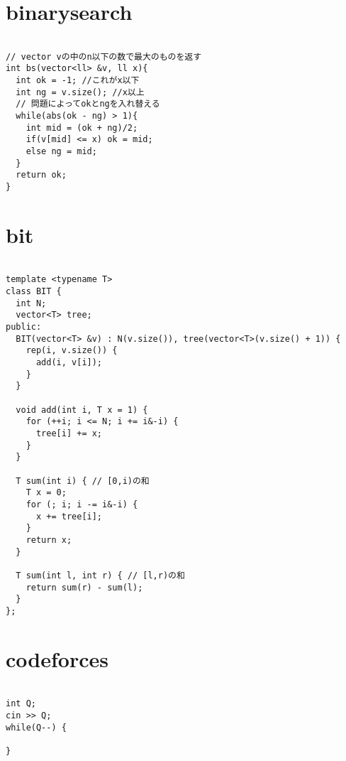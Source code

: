 \documentclass[a4j,titlepage]{jarticle} %
\begin{document}
\color{white}
\section{binarysearch}
\color{black}
\begin{lstlisting}[caption=binarysearch]

// vector vの中のn以下の数で最大のものを返す
int bs(vector<ll> &v, ll x){
  int ok = -1; //これがx以下 
  int ng = v.size(); //x以上 
  // 問題によってokとngを入れ替える
  while(abs(ok - ng) > 1){
    int mid = (ok + ng)/2;
    if(v[mid] <= x) ok = mid;
    else ng = mid;
  }
  return ok;
}

\end{lstlisting}

\color{white}
\section{bit}
\color{black}
\begin{lstlisting}[caption=bit]

template <typename T>
class BIT {
  int N;
  vector<T> tree;
public:
  BIT(vector<T> &v) : N(v.size()), tree(vector<T>(v.size() + 1)) {
    rep(i, v.size()) {
      add(i, v[i]);
    }
  }

  void add(int i, T x = 1) {
    for (++i; i <= N; i += i&-i) {
      tree[i] += x;
    }
  }

  T sum(int i) { // [0,i)の和
    T x = 0;
    for (; i; i -= i&-i) {
      x += tree[i];
    }
    return x;
  }

  T sum(int l, int r) { // [l,r)の和
    return sum(r) - sum(l);
  }
};

\end{lstlisting}

\color{white}
\section{codeforces}
\color{black}
\begin{lstlisting}[caption=codeforces]

int Q;
cin >> Q;
while(Q--) {
  
}

\end{lstlisting}

\color{white}
\end{document}
